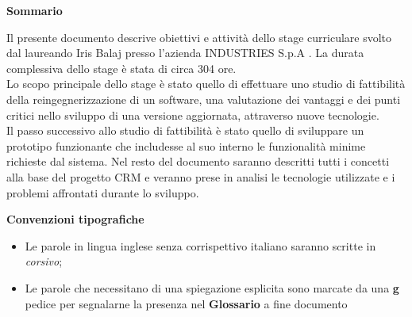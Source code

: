{\Large \textbf{Sommario}}
\newline

Il presente documento descrive obiettivi e attività dello stage curriculare svolto dal laureando Iris Balaj presso l’azienda INDUSTRIES S.p.A .
La durata complessiva dello stage è stata di circa 304 ore.\\
Lo scopo principale dello stage è stato quello di effettuare uno studio di fattibilità della reingegnerizzazione di un software, una valutazione dei vantaggi
e dei punti critici nello sviluppo di una versione aggiornata, attraverso nuove tecnologie.\\
Il passo successivo allo studio di fattibilità è stato quello di sviluppare un prototipo funzionante che includesse al suo interno le funzionalità minime
richieste dal sistema.
Nel resto del documento saranno descritti tutti i concetti alla base del progetto CRM e veranno prese in analisi le tecnologie utilizzate e i
problemi affrontati durante lo sviluppo.

\vspace{20mm}
\textbf{Convenzioni tipografiche}

\begin{itemize}
 	\item Le parole in lingua inglese senza corrispettivo italiano saranno scritte in \textit{corsivo};
	\item Le parole che necessitano di una spiegazione esplicita sono marcate da una \textbf{g} pedice per segnalarne la presenza nel \textbf{Glossario} a fine documento
\end{itemize}
